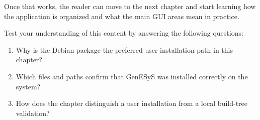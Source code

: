 Once that works, the reader can move to the next chapter and start learning how
the application is organized and what the main GUI areas mean in practice.

Test your understanding of this content by answering the following questions:

\begin{enumerate}
\item Why is the Debian package the preferred user-installation path in this chapter?
\item Which files and paths confirm that GenESyS was installed correctly on the system?
\item How does the chapter distinguish a user installation from a local build-tree validation?
\end{enumerate}
